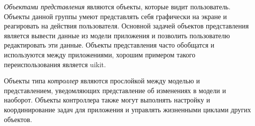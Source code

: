 \emph{Объектами представления} являются объекты, которые видит пользователь. Объекты данной группы умеют представлять себя графически на экране и реагировать на действия пользователя. Основной задачей объектов представления является вывести данные из модели приложения и позволить пользователю редактировать эти данные. Объекты представления часто обобщатся и используются между приложениями, хорошим примером такого переиспользования является \gls{uikit}. 

Объекты типа \emph{котроллер} являются прослойкой между моделью и представлением, уведомляющих представление об изменениях в модели и наоборот. Объекты контроллера также могут выполнять настройку и координирование задач для приложения и управлять жизненными циклами других объектов. 